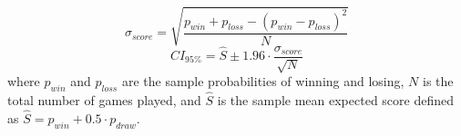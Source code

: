 \begin{equation}
    \sigma_{score} = \sqrt{\frac{p_{win} + p_{loss} - (p_{win} - p_{loss})^2}{N}}
\end{equation}
\begin{equation}
    CI_{95\%} = \hat{S} \pm 1.96 \cdot \frac{\sigma_{score}}{\sqrt{N}}
\end{equation}
where $p_{win}$ and $p_{loss}$ are the sample probabilities of winning and losing, $N$ is the total number of games played, and $\hat{S}$ is the sample mean expected score defined as $\hat{S}=p_{win}+0.5\cdot p_{draw}$.
